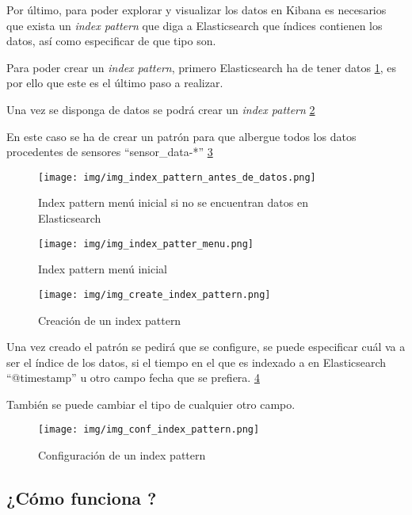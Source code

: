 Por último, para poder explorar y visualizar los datos en Kibana es necesarios que exista un \textit{index pattern} que diga a Elasticsearch que índices contienen los datos, así como especificar de que tipo son. \cite{pagina:elastic}

Para poder crear un \textit{index pattern}, primero Elasticsearch ha de tener datos \ref{img_index_pattern_antes_de_datos.png}, es por ello que este es el último paso a realizar.

Una vez se disponga de datos se podrá crear un \textit{index pattern} \ref{img_index_patter_menu.png}

En este caso se ha de crear un patrón para que albergue todos los datos procedentes de sensores ``sensor\_data-*'' \ref{img_create_index_pattern.png}

\begin{figure}[h]
	\centering
	\texttt{[image: img/img\_index\_pattern\_antes\_de\_datos.png]}
	\caption{Index pattern menú inicial si no se encuentran datos en Elasticsearch}
	\label{img_index_pattern_antes_de_datos.png}
\end{figure}

\begin{figure}[h]
	\centering
	\texttt{[image: img/img\_index\_patter\_menu.png]}
	\caption{Index pattern menú inicial}
	\label{img_index_patter_menu.png}
\end{figure}

\begin{figure}[h]
	\centering
	\texttt{[image: img/img\_create\_index\_pattern.png]}
	\caption{Creación de un index pattern}
	\label{img_create_index_pattern.png}
\end{figure}

Una vez creado el patrón se pedirá que se configure, se puede especificar cuál va a ser el índice de los datos, si el tiempo en el que es indexado a en Elasticsearch ``@timestamp'' u otro campo fecha que se prefiera. \ref{img_conf_index_pattern.png}

También se puede cambiar el tipo de cualquier otro campo. 

\begin{figure}[h]
	\centering
	\texttt{[image: img/img\_conf\_index\_pattern.png]}
	\caption{Configuración de un index pattern}
	\label{img_conf_index_pattern.png}
\end{figure}

\clearpage

\subsection{¿Cómo funciona \nombrePrograma?}

